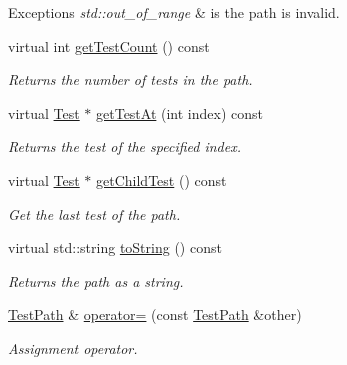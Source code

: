\begin{DoxyCompactItemize}
\begin{DoxyCompactList}
\begin{DoxyExceptions}{Exceptions}
{\em std\-::out\-\_\-of\-\_\-range} & is the path is invalid. \\
\hline
\end{DoxyExceptions}
\end{DoxyCompactList}\item 
virtual int \hyperlink{class_test_path_aab585e5b6dcc541fd92701173de5628b}{get\-Test\-Count} () const 
\begin{DoxyCompactList}\small\item\em Returns the number of tests in the path. \end{DoxyCompactList}\item 
virtual \hyperlink{class_test}{Test} $\ast$ \hyperlink{class_test_path_a320c9cb5c72b21b59f98fa4c956d0c0b}{get\-Test\-At} (int index) const 
\begin{DoxyCompactList}\small\item\em Returns the test of the specified index. \end{DoxyCompactList}\item 
virtual \hyperlink{class_test}{Test} $\ast$ \hyperlink{class_test_path_abd8fdd67607d785e26e844ee0b90366c}{get\-Child\-Test} () const 
\begin{DoxyCompactList}\small\item\em Get the last test of the path. \end{DoxyCompactList}\item 
virtual std\-::string \hyperlink{class_test_path_a75ec4a351f0734cefbf449325d7442ee}{to\-String} () const 
\begin{DoxyCompactList}\small\item\em Returns the path as a string. \end{DoxyCompactList}\item 
\hyperlink{class_test_path}{Test\-Path} \& \hyperlink{class_test_path_aff11ba5cda48eb2a9c657e848650945f}{operator=} (const \hyperlink{class_test_path}{Test\-Path} \&other)
\begin{DoxyCompactList}\small\item\em Assignment operator. \end{DoxyCompactList}\end{DoxyCompactItemize}
